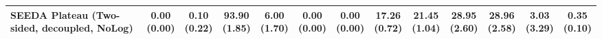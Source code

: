 \begin{table}[H]
{\begin{tabular}{l|cccccc|cccccc}
SEEDA Plateau (Two-sided, decoupled, NoLog) & \makecell{0.00 \\ (0.00)} & \makecell{0.10 \\ (0.22)} & {\cellcolor[HTML]{C8E6C9}} \bfseries \makecell{93.90 \\ (1.85)} & \makecell{6.00 \\ (1.70)} & \makecell{0.00 \\ (0.00)} & \makecell{0.00 \\ (0.00)} & \makecell{17.26 \\ (0.72)} & \makecell{21.45 \\ (1.04)} & {\cellcolor[HTML]{C8E6C9}} \makecell{28.95 \\ (2.60)} & \bfseries \makecell{28.96 \\ (2.58)} & \makecell{3.03 \\ (3.29)} & \makecell{0.35 \\ (0.10)} \\
\bottomrule
\end{tabular}
}%
\end{table}
